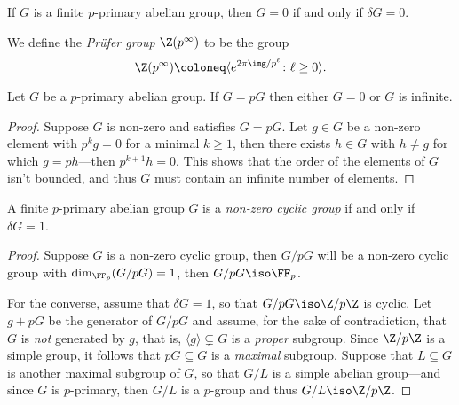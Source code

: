 \begin{corollary}
    \label{cor:finite-p-primary-is-trivial-iff-delta-is-zero}
    If \(G\) is a finite \(p\)-primary abelian group, then \(G = 0\) if and only if
    \(\delta G = 0\).
\end{corollary}

\begin{definition}
    \label{def:prufer-grp}
    We define the \emph{Pr\"{u}fer group} \(\Z(p^{\infty})\) to be the group
    \[
        \Z(p^{\infty}) \coloneq \langle e^{2 \pi \img / p^\ell} \colon \ell \geq 0 \rangle.
    \]
\end{definition}

\begin{lemma}
    \label{lem:G=pG-for-p-primary-iff-zero-or-infinite}
    Let \(G\) be a \(p\)-primary abelian group. If \(G = p G\) then either \(G = 0\)
    or \(G\) is infinite.
\end{lemma}

\begin{proof}
    Suppose \(G\) is non-zero and satisfies \(G = p G\). Let \(g \in G\) be a
    non-zero element with \(p^k g = 0\) for a minimal \(k \geq 1\), then there
    exists \(h \in G\) with \(h \neq g\) for which \(g = p h\)---then
    \(p^{k+1} h = 0\). This shows that the order of the elements of \(G\) isn't
    bounded, and thus \(G\) must contain an infinite number of elements.
\end{proof}

\begin{lemma}
    \label{lem:finite-p-primary-is-cyclic-iff-delta-is-one}
    A finite \(p\)-primary abelian group \(G\) is a \emph{non-zero cyclic group} if
    and only if \(\delta G = 1\).
\end{lemma}

\begin{proof}
    Suppose \(G\) is a non-zero cyclic group, then \(G/pG\) will be a non-zero
    cyclic group with \(\dim_{\FF_p}(G/pG) = 1\), then \(G/pG \iso \FF_p\).

    For the converse, assume that \(\delta G = 1\), so that \(G/pG \iso \Z/p\Z\) is
    cyclic. Let \(g + p G\) be the generator of \(G/pG\) and assume, for the sake of
    contradiction, that \(G\) is \emph{not} generated by \(g\), that is,
    \(\langle g \rangle \subsetneq G\) is a \emph{proper} subgroup. Since \(\Z/p\Z\)
    is a simple group, it follows that \(p G \subseteq G\) is a \emph{maximal}
    subgroup. Suppose that \(L \subseteq G\) is another maximal subgroup of \(G\),
    so that \(G/L\) is a simple abelian group---and since \(G\) is \(p\)-primary,
    then \(G/L\) is a \(p\)-group and thus \(G/L \iso \Z/p\Z\).
\end{proof}


